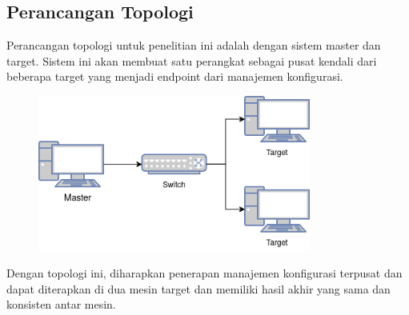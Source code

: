 \documentclass[10pt,]{report}
\begin{document}
\begin{adjustwidth}{20pt}{}
	\subsection{Perancangan Topologi}
	\begin{adjustwidth}{20pt}{}
		\hspace\parindent
		Perancangan topologi untuk penelitian ini adalah dengan sistem master dan
		target. Sistem ini akan membuat satu perangkat sebagai pusat kendali dari
		beberapa target yang menjadi endpoint dari manajemen konfigurasi.\\
		\begin{figure}[H]
			\centering
			\includegraphics[width=0.8\textwidth]{images/base-topology.png}
		\end{figure}
		Dengan topologi ini, diharapkan penerapan manajemen konfigurasi terpusat
		dan dapat diterapkan di dua mesin target dan memiliki hasil akhir yang sama
		dan konsisten antar mesin.\\
	\end{adjustwidth}
\end{adjustwidth}
\end{document}

